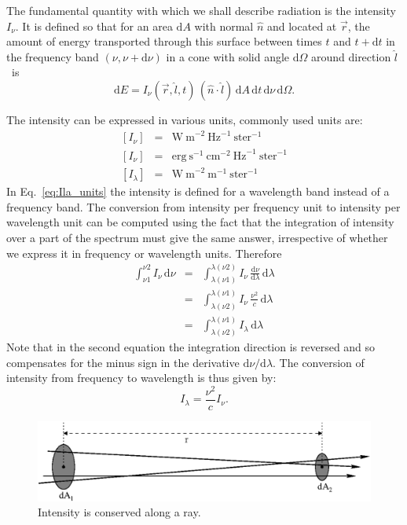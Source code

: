 \documentclass[12pt]{article}
\numberwithin{equation}{section}
\def\dd{\mathrm{d}}
\def\Inu{\ensuremath{I_{\nu}}}
\def\Ila{\ensuremath{I_{\lambda}}}
\def\dnu{\ensuremath{\dd \nu}}
\def\vr{\ensuremath{\vec{r}}}
\def\un{\ensuremath{\hat{n}}}
\def\ul{\ensuremath{\hat{l}}}
\newcommand{\be}{\begin{equation}}
\newcommand{\ee}{\end{equation}}
\newcommand{\bea}{\begin{eqnarray}}
\newcommand{\eea}{\end{eqnarray}}
\begin{document}
The fundamental quantity with which we shall describe radiation is the intensity \Inu. It is defined so that for an area $\dd A$ with normal $\un$ and located at $\vec{r}$, the amount of energy transported through this surface between times $t$ and $t+\dd t$ in the frequency band $(\nu,\nu+\dd \nu)$ in a cone with solid angle $\dd \Omega$ around direction \ul\ is
\be
\dd E = \Inu(\vr, \ul ,t) \, (\hat{n} \cdot \hat{l}) \, \dd A \, \dd t \,  \dd \nu \,  \dd \Omega.
\ee 

The intensity can be expressed in various units, commonly used units are:
\bea 
\left[  \Inu  \right] & = &  \mathrm{W\ m}^{-2} \ \mathrm{Hz}^{-1} \ \mathrm{ster}^{-1} \\
\left[  \Inu \right]  & = &   \mathrm{erg}\ \mathrm{s}^{-1} \  \mathrm{cm}^{-2} \ \mathrm{Hz}^{-1} \ \mathrm{ster}^{-1} \\
 \left[    \Ila  \right]  &=&  \mathrm{W\ m}^{-2} \ \mathrm{m}^{-1} \ \mathrm{ster}^{-1} \label{eq:Ila_units}
\eea
In Eq.~\ref{eq:Ila_units} the intensity is defined for a wavelength band instead of a frequency band. The conversion from intensity per frequency unit to intensity per wavelength unit can be computed using the fact that the integration of intensity over a part of the spectrum must give the same answer, irrespective of whether we express it in frequency or wavelength units. Therefore
\bea
\int_{\nu1}^{\nu2} \Inu \, \dnu &=& \int_{\lambda(\nu1)}^{\lambda(\nu2)} \Inu \, \frac{\dnu}{\dd \lambda} \, \dd \lambda \nonumber \\
 & = & \int_{\lambda(\nu2)}^{\lambda(\nu1)} \Inu \, \frac{\nu^2}{c} \, \dd \lambda \nonumber \\
  & = &  \int_{\lambda(\nu2)}^{\lambda(\nu1)} \Ila \, \dd \lambda
\eea
Note that in the second equation the integration direction is reversed and so compensates for the minus sign in the derivative $\dnu / \dd \lambda$. The conversion of intensity from frequency to wavelength is thus given by:
\be
\Ila = \frac{\nu^2}{c} \Inu.
\ee

\begin{figure}
  \centering
  \includegraphics[width=12cm]{figs/intensity_conserved}
  \caption{Intensity is conserved along a ray.
  \label{fig:intensity_conserved}}
\end{figure}
\end{document}

